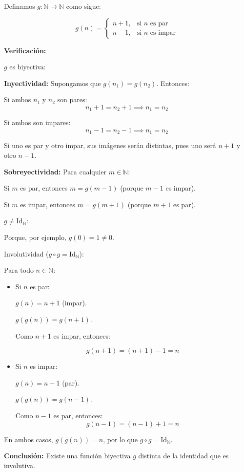 \begin{solution}
\begin{enumerate}
      Definamos \( g : \mathbb{N} \rightarrow \mathbb{N} \) como sigue:
      
      \[
      g(n) = \begin{cases}
      n + 1, & \text{si } n \text{ es par} \\
      n - 1, & \text{si } n \text{ es impar}
      \end{cases}
      \]
      
      \textbf{Verificación:}
      
      \( g \) es biyectiva:
      
      \textbf{Inyectividad:} Supongamos que \( g(n_1) = g(n_2) \). Entonces:
      
      Si ambos \( n_1 \) y \( n_2 \) son pares:
      \[n_1 + 1 = n_2 + 1 \implies n_1 = n_2\]
      
      Si ambos son impares: 
      \[n_1 - 1 = n_2 - 1 \implies n_1 = n_2\]
      
      Si uno es par y otro impar, sus imágenes serán distintas, pues uno será \( n + 1 \) y otro \( n - 1 \).
      
      \textbf{Sobreyectividad:} Para cualquier \( m \in \mathbb{N} \):
      
      Si \( m \) es par, entonces \( m = g(m - 1) \) (porque \( m - 1 \) es impar).
      
      Si \( m \) es impar, entonces \( m = g(m + 1) \) (porque \( m + 1 \) es par).
      
      \( g \neq \text{Id}_{\mathbb{N}} \):
      
      Porque, por ejemplo, \( g(0) = 1 \neq 0 \).
      
      Involutividad (\( g \circ g = \text{Id}_{\mathbb{N}} \)):
      
      Para todo \( n \in \mathbb{N} \):
      
      \begin{itemize}
        \item Si \( n \) es par:
        
        \( g(n) = n + 1 \) (impar).
            
        \( g(g(n)) = g(n + 1) \).
        
        Como \( n + 1 \) es impar, entonces:
        
        \[g(n + 1) = (n + 1) - 1 = n\]
        
        \item Si \( n \) es impar:
        
        \( g(n) = n - 1 \) (par).
        
        \( g(g(n)) = g(n - 1) \).
        
        Como \( n - 1 \) es par, entonces:
        \[g(n - 1) = (n - 1) + 1 = n\]
      \end{itemize}
      
        En ambos casos, \( g(g(n)) = n \), por lo que \( g \circ g = \text{Id}_{\mathbb{N}} \).
      
      \textbf{Conclusión:} Existe una función biyectiva \( g \) distinta de la identidad que es involutiva.
    \end{enumerate}
\end{solution}